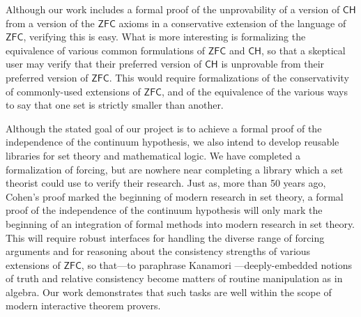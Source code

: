 \documentclass[a4paper,USenglish,cleveref, autoref]{lipics-v2019}
\theoremstyle{theorem}
\theoremstyle{definition}
\begin{document}
Although our work includes a formal proof of the unprovability of a version of $\mathsf{CH}$ from a version of the $\mathsf{ZFC}$ axioms in a conservative extension of the language of $\mathsf{ZFC}$, verifying this is easy. What is more interesting is formalizing the equivalence of various common formulations of $\mathsf{ZFC}$ and $\mathsf{CH}$, so that a skeptical user may verify that their preferred version of $\mathsf{CH}$ is unprovable from their preferred version of $\mathsf{ZFC}$. This would require formalizations of the conservativity of commonly-used extensions of $\mathsf{ZFC}$, and of the equivalence of the various ways to say that one set is strictly smaller than another. %

Although the stated goal of our project is to achieve a formal proof of the independence of the continuum hypothesis, we also intend to develop reusable libraries for set theory and mathematical logic. We have completed a formalization of forcing, but are nowhere near completing a library which a set theorist could use to verify their research. Just as, more than 50 years ago, Cohen's proof marked the beginning of modern research in set theory, a formal proof of the independence of the continuum hypothesis will only mark the beginning of an integration of formal methods into modern research in set theory. This will require robust interfaces for handling the diverse range of forcing arguments and for reasoning about the consistency strengths of various extensions of $\mathsf{ZFC}$, so that---to paraphrase Kanamori \cite{kanamori1996mathematical, kanamori2008higher}---deeply-embedded notions of truth and relative consistency become matters of routine manipulation as in algebra. Our work demonstrates that such tasks are well within the scope of modern interactive theorem provers.

\end{document}
